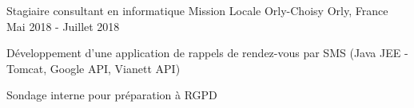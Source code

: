 \begin{cventries}
  \cventry
    {Stagiaire consultant en informatique} %
    {Mission Locale Orly-Choisy} %
    {Orly, France} %
    {Mai 2018 - Juillet 2018} %
    {
      \begin{cvitems} %
        \item {Développement d'une application de rappels de rendez-vous par SMS (Java JEE - Tomcat, Google API, Vianett API)}
        \item {Sondage interne pour préparation à RGPD}
      \end{cvitems}
    }
\end{cventries}

